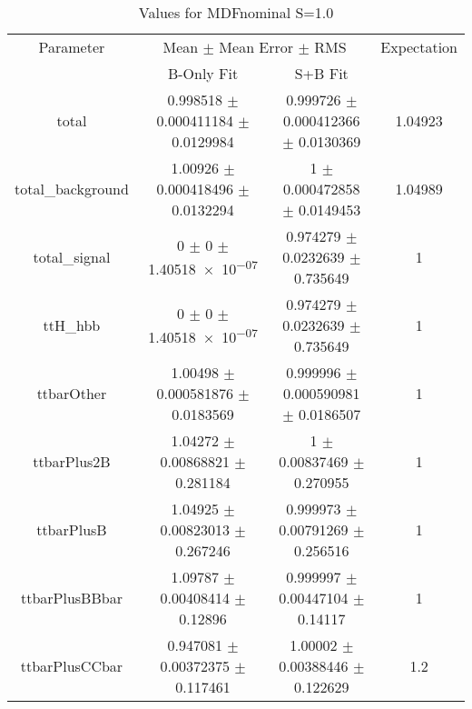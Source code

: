 \begin{table}
\centering
\caption{Values for MDFnominal S=1.0}
\begin{tabular}{cccc}
\toprule
Parameter & \multicolumn{2}{c}{Mean $\pm$ Mean Error $\pm$ RMS} & Expectation\\
 & B-Only Fit & S+B Fit & \\
\midrule
total & \num{0.998518} $\pm$ \num{0.000411184} $\pm$ \num{0.0129984} & \num{0.999726} $\pm$ \num{0.000412366} $\pm$ \num{0.0130369} & \num{1.04923}\\
total\_background & \num{1.00926} $\pm$ \num{0.000418496} $\pm$ \num{0.0132294} & \num{1} $\pm$ \num{0.000472858} $\pm$ \num{0.0149453} & \num{1.04989}\\
total\_signal & \num{0} $\pm$ \num{0} $\pm$ \num{1.40518e-07} & \num{0.974279} $\pm$ \num{0.0232639} $\pm$ \num{0.735649} & \num{1}\\
ttH\_hbb & \num{0} $\pm$ \num{0} $\pm$ \num{1.40518e-07} & \num{0.974279} $\pm$ \num{0.0232639} $\pm$ \num{0.735649} & \num{1}\\
ttbarOther & \num{1.00498} $\pm$ \num{0.000581876} $\pm$ \num{0.0183569} & \num{0.999996} $\pm$ \num{0.000590981} $\pm$ \num{0.0186507} & \num{1}\\
ttbarPlus2B & \num{1.04272} $\pm$ \num{0.00868821} $\pm$ \num{0.281184} & \num{1} $\pm$ \num{0.00837469} $\pm$ \num{0.270955} & \num{1}\\
ttbarPlusB & \num{1.04925} $\pm$ \num{0.00823013} $\pm$ \num{0.267246} & \num{0.999973} $\pm$ \num{0.00791269} $\pm$ \num{0.256516} & \num{1}\\
ttbarPlusBBbar & \num{1.09787} $\pm$ \num{0.00408414} $\pm$ \num{0.12896} & \num{0.999997} $\pm$ \num{0.00447104} $\pm$ \num{0.14117} & \num{1}\\
ttbarPlusCCbar & \num{0.947081} $\pm$ \num{0.00372375} $\pm$ \num{0.117461} & \num{1.00002} $\pm$ \num{0.00388446} $\pm$ \num{0.122629} & \num{1.2}\\
\bottomrule
\end{tabular}
\end{table}